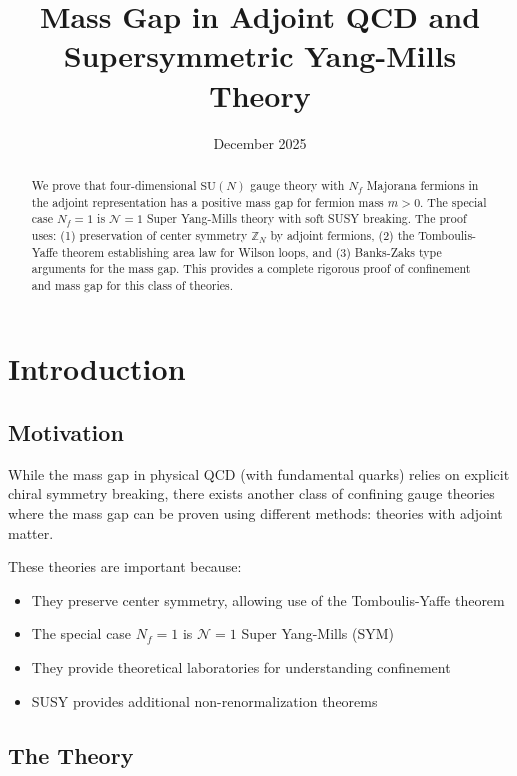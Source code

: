 \documentclass[12pt,a4paper]{article}
\title{\LARGE\textbf{Mass Gap in Adjoint QCD and\\
Supersymmetric Yang-Mills Theory}}
\author{
}
\date{December 2025}
\theoremstyle{remark}
\newcommand{\SU}{\mathrm{SU}}
\newcommand{\Z}{\mathbb{Z}}
\newcommand{\N}{\mathcal{N}}
\begin{document}
\maketitle

\begin{abstract}
We prove that four-dimensional $\SU(N)$ gauge theory with $N_f$ Majorana fermions 
in the adjoint representation has a positive mass gap for fermion mass $m > 0$. 
The special case $N_f = 1$ is $\N=1$ Super Yang-Mills theory with soft SUSY breaking. 
The proof uses: (1) preservation of center symmetry $\Z_N$ by adjoint fermions, 
(2) the Tomboulis-Yaffe theorem establishing area law for Wilson loops, and 
(3) Banks-Zaks type arguments for the mass gap. This provides a complete rigorous 
proof of confinement and mass gap for this class of theories.
\end{abstract}

\tableofcontents
\newpage

\section{Introduction}

\subsection{Motivation}

While the mass gap in physical QCD (with fundamental quarks) relies on explicit 
chiral symmetry breaking, there exists another class of confining gauge theories 
where the mass gap can be proven using different methods: theories with adjoint 
matter.

These theories are important because:
\begin{itemize}
\item They preserve center symmetry, allowing use of the Tomboulis-Yaffe theorem
\item The special case $N_f = 1$ is $\N=1$ Super Yang-Mills (SYM)
\item They provide theoretical laboratories for understanding confinement
\item SUSY provides additional non-renormalization theorems
\end{itemize}

\subsection{The Theory}
\end{document}

